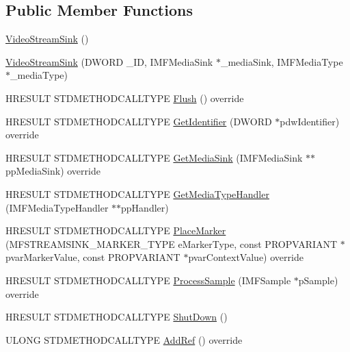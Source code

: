 \subsection*{Public Member Functions}
\begin{DoxyCompactItemize}
\item 
\hyperlink{class_video_stream_sink_a59cf0aadbf591f15639de8c55cba9566}{Video\+Stream\+Sink} ()
\item 
\hyperlink{class_video_stream_sink_a7bf6f8b7198889702a8b4edebcce2a2a}{Video\+Stream\+Sink} (D\+W\+O\+RD \+\_\+\+ID, I\+M\+F\+Media\+Sink $\ast$\+\_\+media\+Sink, I\+M\+F\+Media\+Type $\ast$\+\_\+media\+Type)
\item 
H\+R\+E\+S\+U\+LT S\+T\+D\+M\+E\+T\+H\+O\+D\+C\+A\+L\+L\+T\+Y\+PE \hyperlink{class_video_stream_sink_a1411d89f9b2a207fc27c99f0a7d3f418}{Flush} () override
\item 
H\+R\+E\+S\+U\+LT S\+T\+D\+M\+E\+T\+H\+O\+D\+C\+A\+L\+L\+T\+Y\+PE \hyperlink{class_video_stream_sink_a5df50da042cabe20a95ee9ff49b8f822}{Get\+Identifier} (D\+W\+O\+RD $\ast$pdw\+Identifier) override
\item 
H\+R\+E\+S\+U\+LT S\+T\+D\+M\+E\+T\+H\+O\+D\+C\+A\+L\+L\+T\+Y\+PE \hyperlink{class_video_stream_sink_a22f10cf56dcc8b49ddfc6b3ac6592fb4}{Get\+Media\+Sink} (I\+M\+F\+Media\+Sink $\ast$$\ast$pp\+Media\+Sink) override
\item 
H\+R\+E\+S\+U\+LT S\+T\+D\+M\+E\+T\+H\+O\+D\+C\+A\+L\+L\+T\+Y\+PE \hyperlink{class_video_stream_sink_a11f8f4686f3c93cda40e6cc7856c3cfb}{Get\+Media\+Type\+Handler} (I\+M\+F\+Media\+Type\+Handler $\ast$$\ast$pp\+Handler)
\item 
H\+R\+E\+S\+U\+LT S\+T\+D\+M\+E\+T\+H\+O\+D\+C\+A\+L\+L\+T\+Y\+PE \hyperlink{class_video_stream_sink_a58bdb0f2bd7619386b4d31fc6121a6ef}{Place\+Marker} (M\+F\+S\+T\+R\+E\+A\+M\+S\+I\+N\+K\+\_\+\+M\+A\+R\+K\+E\+R\+\_\+\+T\+Y\+PE e\+Marker\+Type, const P\+R\+O\+P\+V\+A\+R\+I\+A\+NT $\ast$pvar\+Marker\+Value, const P\+R\+O\+P\+V\+A\+R\+I\+A\+NT $\ast$pvar\+Context\+Value) override
\item 
H\+R\+E\+S\+U\+LT S\+T\+D\+M\+E\+T\+H\+O\+D\+C\+A\+L\+L\+T\+Y\+PE \hyperlink{class_video_stream_sink_af96e8b969c8eedfc1d04e4be75960868}{Process\+Sample} (I\+M\+F\+Sample $\ast$p\+Sample) override
\item 
H\+R\+E\+S\+U\+LT S\+T\+D\+M\+E\+T\+H\+O\+D\+C\+A\+L\+L\+T\+Y\+PE \hyperlink{class_video_stream_sink_a83f26167f52bf444d677a8d8f07ca98c}{Shut\+Down} ()
\item 
U\+L\+O\+NG S\+T\+D\+M\+E\+T\+H\+O\+D\+C\+A\+L\+L\+T\+Y\+PE \hyperlink{class_video_stream_sink_ae9d980199bb2e8b34d05c5bd1ef90463}{Add\+Ref} () override

\end{DoxyCompactItemize}
